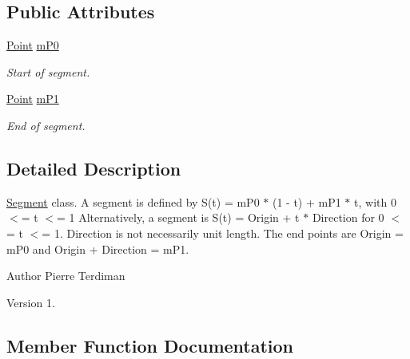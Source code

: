 \subsection*{Public Attributes}
\begin{DoxyCompactItemize}
\item 
\hyperlink{classPoint}{Point} \hyperlink{classSegment_a728fd28f0e3e55f6451191cb58e08ad4}{m\+P0}\hypertarget{classSegment_a728fd28f0e3e55f6451191cb58e08ad4}{}\label{classSegment_a728fd28f0e3e55f6451191cb58e08ad4}

\begin{DoxyCompactList}\small\item\em Start of segment. \end{DoxyCompactList}\item 
\hyperlink{classPoint}{Point} \hyperlink{classSegment_adacb19db251a4bd1da51db8376e059cc}{m\+P1}\hypertarget{classSegment_adacb19db251a4bd1da51db8376e059cc}{}\label{classSegment_adacb19db251a4bd1da51db8376e059cc}

\begin{DoxyCompactList}\small\item\em End of segment. \end{DoxyCompactList}\end{DoxyCompactItemize}


\subsection{Detailed Description}
\hyperlink{classSegment}{Segment} class. A segment is defined by S(t) = m\+P0 $\ast$ (1 -\/ t) + m\+P1 $\ast$ t, with 0 $<$= t $<$= 1 Alternatively, a segment is S(t) = Origin + t $\ast$ Direction for 0 $<$= t $<$= 1. Direction is not necessarily unit length. The end points are Origin = m\+P0 and Origin + Direction = m\+P1.

\begin{DoxyAuthor}{Author}
Pierre Terdiman 
\end{DoxyAuthor}
\begin{DoxyVersion}{Version}
1. 
\end{DoxyVersion}


\subsection{Member Function Documentation}
